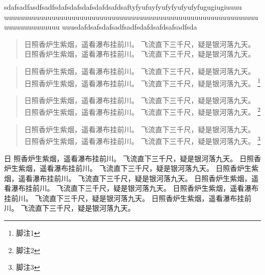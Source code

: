 \documentclass[12pt]{article}
\begin{document}
sdafsadfasdfsadfsdafsdafsdafsdafdsafdsaftyfyufuyfyufyfyufyufyfugugiugiuuuu
uuuuuuuuuuuuuuuuuuuuuuuuuuuuuuuuuuuuuuuuuuuuuuuuuuuuuuuuuuuuuuuuuuuuuuuuuuuuuu
uuusdafdsafsdafsadfsadfsdafdsafdsafsadfsda

\begin{abstract}
日照香炉生紫烟，遥看瀑布挂前川。
飞流直下三千尺，疑是银河落九天。
日照香炉生紫烟，遥看瀑布挂前川。
飞流直下三千尺，疑是银河落九天。\\
\end{abstract}

\begin{quote}
日照香炉生紫烟，遥看瀑布挂前川。
飞流直下三千尺，疑是银河落九天。
日照香炉生紫烟，遥看瀑布挂前川。
飞流直下三千尺，疑是银河落九天。
\footnote{脚注1}
\end{quote}

\begin{quotation}
日照香炉生紫烟，遥看瀑布挂前川。
飞流直下三千尺，疑是银河落九天。
日照香炉生紫烟，遥看瀑布挂前川。
飞流直下三千尺，疑是银河落九天。
\footnote{脚注2}
\end{quotation}

\begin{verse}
日照香炉生紫烟，遥看瀑布挂前川。
飞流直下三千尺，疑是银河落九天。
日照香炉生紫烟，遥看瀑布挂前川。
飞流直下三千尺，疑是银河落九天。
\footnote{脚注3}
\end{verse}

日
照香炉生紫烟，遥看瀑布挂前川。
飞流直下三千尺，疑是银河落九天。
日照香炉生紫烟，遥看瀑布挂前川。
飞流直下三千尺，疑是银河落九天。
日照香炉生紫烟，遥看瀑布挂前川。
飞流直下三千尺，疑是银河落九天。
日照香炉生紫烟，遥看瀑布挂前川。
飞流直下三千尺，疑是银河落九天。
日照香炉生紫烟，遥看瀑布挂前川。
飞流直下三千尺，疑是银河落九天。
日照香炉生紫烟，遥看瀑布挂前川。
飞流直下三千尺，疑是银河落九天。
\end{document}
